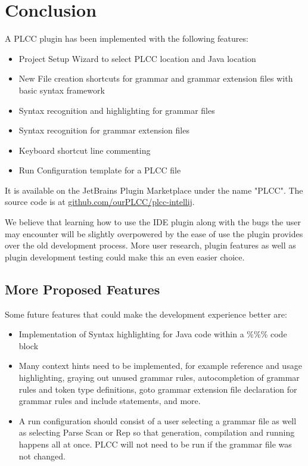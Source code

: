 \documentclass[conference, letterpaper]{IEEEtran}
\begin{document}
\section{Conclusion}\label{sec:conclusion}
A PLCC plugin has been implemented with the following features:
\begin{itemize}
    \item Project Setup Wizard to select PLCC location and Java location
    \item New File creation shortcuts for grammar and grammar extension files with basic syntax framework
    \item Syntax recognition and highlighting for grammar files
    \item Syntax recognition for grammar extension files
    \item Keyboard shortcut line commenting
    \item Run Configuration template for a PLCC file
\end{itemize}
It is available on the JetBrains Plugin Marketplace under the name "PLCC".
The source code is at \href{https://github.com/ourPLCC/plcc-intellij}{github.com/ourPLCC/plcc-intellij}.

We believe that learning how to use the IDE plugin along with the bugs the user may encounter will be slightly overpowered by the ease of use the plugin provides over the old development process.
More user research, plugin features as well as plugin development testing could make this an even easier choice.

\subsection{More Proposed Features}\label{subsec:more-proposed-features}

Some future features that could make the development experience better are:
\begin{itemize}
    \item Implementation of Syntax highlighting for Java code within a \%\%\% code block
    \item Many context hints need to be implemented, for example reference and usage highlighting, graying out unused grammar rules, autocompletion of grammar rules and token type definitions, goto grammar extension file declaration for grammar rules and include statements, and more.
    \item A run configuration should consist of a user selecting a grammar file as well as selecting Parse Scan or Rep so that generation, compilation and running happens all at once.
    PLCC will not need to be run if the grammar file was not changed.
\end{itemize}
\end{document}
